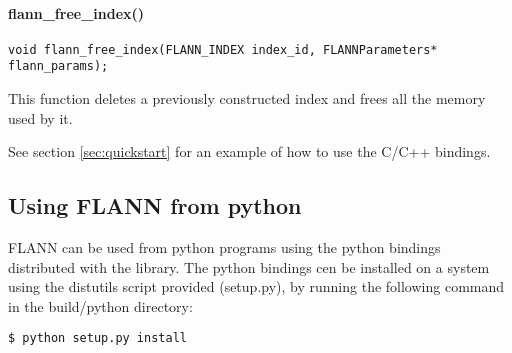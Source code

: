 \documentclass[letter,10pt]{article}
\begin{document}
\paragraph{flann\_free\_index()}
\begin{Verbatim}[fontsize=\footnotesize,frame=single]
void flann_free_index(FLANN_INDEX index_id, FLANNParameters* flann_params);
\end{Verbatim}
This function deletes a previously constructed index and frees all the memory
used by it.

\bigskip

See section \ref{sec:quickstart} for an example of how to use the C/C++
bindings.

\subsection{Using FLANN from python}

FLANN can be used from python programs using the python bindings distributed
with the library. The python bindings cen be installed on a system using the
distutils script provided (setup.py), by running the following command in the
build/python directory:
\begin{Verbatim}[fontsize=\footnotesize,frame=single]
$ python setup.py install
\end{Verbatim}
\end{document}

